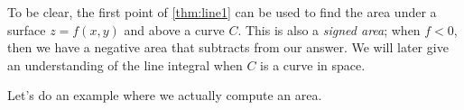 
To be clear, the first point of \autoref{thm:line1} can be used to find the area under a surface $z=f(x,y)$ and above a curve $C$. This is also a \emph{signed area}; when $f<0$, then we have a negative area that subtracts from our answer.  We will later give an understanding of the line integral when $C$ is a curve in space.


Let's do an example where we actually compute an area.

